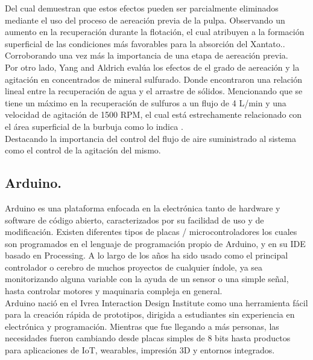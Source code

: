 \documentclass[11pt,letter
								]
								{article}
\begin{document}
Del cual demuestran que estos efectos pueden ser parcialmente eliminados mediante el uso del proceso de aereación previa de la pulpa. Observando un aumento en la recuperación durante la flotación, el cual atribuyen a la formación superficial de las condiciones más favorables para la absorción del Xantato.\cite{Art4}. Corroborando una vez más la importancia de una etapa de aereación previa.\\





Por otro lado, Yang and Aldrich   evalúa los efectos de el grado de aereación y la agitación  en concentrados de mineral  sulfurado. Donde encontraron una relación lineal entre la recuperación de agua y el arrastre de sólidos. Mencionando que se tiene un máximo en la recuperación de sulfuros a un flujo de 4 L/min y una velocidad de agitación de 1500 RPM, el cual está estrechamente relacionado con el área superficial de la burbuja como lo indica \cite{Art5}. \\Destacando la importancia del control del flujo de aire suministrado al sistema como el control de la agitación del mismo.

		\subsection{Arduino.}

Arduino es una plataforma enfocada en  la electrónica tanto de  hardware y software de código abierto, caracterizados por su facilidad de uso y de modificación. Existen diferentes tipos de placas / microcontroladores los cuales son programados en el lenguaje de programación  propio de Arduino, y en su IDE basado en Processing. A lo largo de los años ha sido usado como el  principal controlador o cerebro de muchos proyectos de cualquier índole, ya sea monitorizando alguna variable con la ayuda de un sensor o una simple señal, hasta controlar motores y maquinaria compleja en general.\cite{Ardquees}\\


Arduino nació en el Ivrea Interaction Design Institute como una herramienta fácil para la creación rápida de prototipos, dirigida a estudiantes sin experiencia en electrónica y programación. Mientras que fue llegando a más personas, las necesidades fueron cambiando desde placas simples de 8 bits hasta productos para aplicaciones de IoT, wearables, impresión 3D y entornos integrados.\cite{Ardquees}\\
\end{document}
